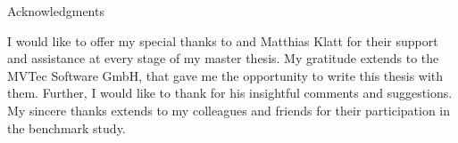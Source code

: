 
\vspace*{20mm}

\begin{center}
{ Acknowledgments}

\vspace{20mm}

I would like to offer my special thanks to \getAdvisor \space and Matthias Klatt for their support and assistance at every stage of my master thesis.
My gratitude extends to the MVTec Software GmbH, that gave me the opportunity to write this thesis with them.
Further, I would like to thank \getSupervisor \space for his insightful comments and suggestions.
My sincere thanks extends to my colleagues and friends for their participation in the benchmark study.


\end{center}

\vspace{10mm}


\cleardoublepage{}

